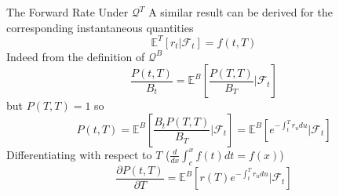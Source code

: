 \documentclass{beamer}
\begin{document}
\begin{frame}{The Forward Rate Under $\mathcal{Q}^T$}
	A similar result can be derived for the corresponding instantaneous quantities
	\begin{equation}
		\mathbb{E}^T[r_t|\mathcal{F}_t] = f(t,T)
	\end{equation}
	Indeed from the definition of $\mathcal{Q}^B$
	\begin{equation*}
		\frac{P(t,T)}{B_t}=\mathbb{E}^B\left[\frac{P(T,T)}{B_T}\bigg|\mathcal{F}_t\right]
	\end{equation*}
	but $P(T,T)=1$ so
	\begin{equation*}
	P(t,T)=\mathbb{E}^B\left[\frac{B_tP(T,T)}{B_T}\bigg|\mathcal{F}_t\right]=\mathbb{E}^B\left[e^{-\int_t^Tr_u du}\big|\mathcal{F}_t\right]
	\end{equation*}
	Differentiating with respect to $T$ ($\frac{d}{dx}\int_c^x f(t)dt=f(x)$)
	\begin{equation*}
	\frac{\partial P(t,T)}{\partial T}=
	\mathbb{E}^B\left[r(T)e^{-\int_t^Tr_u du}\big|\mathcal{F}_t\right]
	\end{equation*}
\end{frame}
\end{document}
